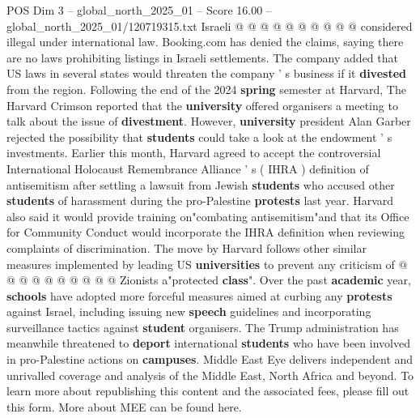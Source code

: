 \begin{textsample}{POS Dim 3 – global\_north\_2025\_01 – Score 16.00 – global\_north\_2025\_01/120719315.txt}
Israeli @ @ @ @ @ @ @ @ @ @ considered illegal under international law.
Booking.com has denied the claims, saying there are no laws prohibiting listings in Israeli settlements.
The company added that US laws in several states would threaten the company ' s business if it \textbf{divested} from the region.
Following the end of the 2024 \textbf{spring} semester at Harvard, The Harvard Crimson reported that the \textbf{university} offered organisers a meeting to talk about the issue of \textbf{divestment}.
However, \textbf{university} president Alan Garber rejected the possibility that \textbf{students} could take a look at the endowment ' s investments.
Earlier this month, Harvard agreed to accept the controversial International Holocaust Remembrance Alliance ' s ( IHRA ) definition of antisemitism after settling a lawsuit from Jewish \textbf{students} who accused other \textbf{students} of harassment during the pro-Palestine \textbf{protests} last year.
Harvard also said it would provide training on"combating antisemitism"and that its Office for Community Conduct would incorporate the IHRA definition when reviewing complaints of discrimination.
The move by Harvard follows other similar measures implemented by leading US \textbf{universities} to prevent any criticism of @ @ @ @ @ @ @ @ @ @ Zionists a"protected \textbf{class}".
Over the past \textbf{academic} year, \textbf{schools} have adopted more forceful measures aimed at curbing any \textbf{protests} against Israel, including issuing new \textbf{speech} guidelines and incorporating surveillance tactics against \textbf{student} organisers.
The Trump administration has meanwhile threatened to \textbf{deport} international \textbf{students} who have been involved in pro-Palestine actions on \textbf{campuses}.
Middle East Eye delivers independent and unrivalled coverage and analysis of the Middle East, North Africa and beyond.
To learn more about republishing this content and the associated fees, please fill out this form.
More about MEE can be found here.

\end{textsample}
